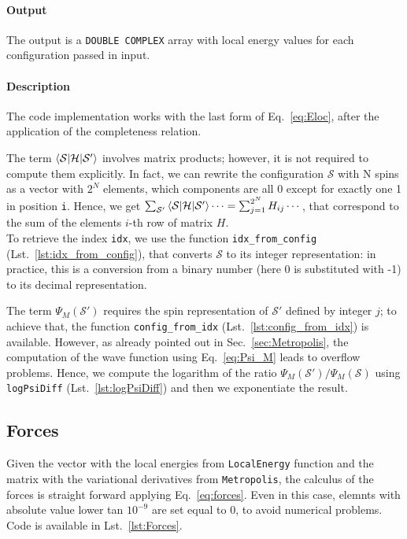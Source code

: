 \documentclass[a4paper,11pt]{article}
\begin{document}
\paragraph{Output}
The output is a \texttt{DOUBLE COMPLEX} array with local energy values for each configuration passed in input.

\paragraph{Description}
The code implementation works with the last form of Eq.~\ref{eq:Eloc}, after the application of the completeness relation.

The term $\braket{\mathcal{S} | \mathcal{H} | \mathcal{S}'}$ involves matrix products; however, it is not required to compute them explicitly. In fact, we can rewrite the configuration $\mathcal{S}$ with N spins as a vector with $2^N$ elements, which components are all 0 except for exactly one 1 in position \texttt{i}. Hence, we get $\sum_{\mathcal{S}'} \braket{\mathcal{S} | \mathcal{H} | \mathcal{S}'} \cdots = \sum_{j=1}^{2^N} H_{ij} \cdots$, that correspond to the sum of the elements $i$-th row of matrix $H$. \\
To retrieve the index \texttt{idx}, we use the function \texttt{idx\_from\_config} (Lst.~\ref{lst:idx_from_config}), that converts $\mathcal{S}$ to its integer representation: in practice, this is a conversion from a binary number (here 0 is substituted with -1) to its decimal representation.

The term $\Psi_M(\mathcal{S}')$ requires the spin representation of $\mathcal{S}'$ defined by integer $j$; to achieve that, the function \texttt{config\_from\_idx} (Lst.~\ref{lst:config_from_idx}) is available. However, as already pointed out in Sec.~\ref{sec:Metropolis}, the computation of the wave function using Eq.~\ref{eq:Psi_M} leads to overflow problems. Hence, we compute the logarithm of the ratio $\Psi_M(\mathcal{S}') / \Psi_M(\mathcal{S})$ using \texttt{logPsiDiff} (Lst.~\ref{lst:logPsiDiff}) and then we exponentiate the result.


\subsection{Forces}

Given the vector with the local energies from \texttt{LocalEnergy} function and the matrix with the variational derivatives from \texttt{Metropolis}, the calculus of the forces is straight forward applying Eq.~\ref{eq:forces}. Even in this case, elemnts with absolute value lower tan $10^{-9}$ are set equal to 0, to avoid numerical problems. Code is available in Lst.~\ref{lst:Forces}.
\end{document}
